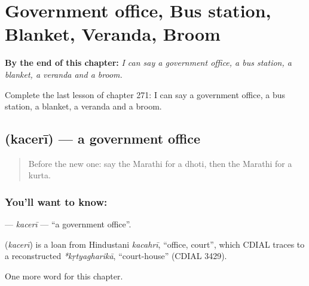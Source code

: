 
\chapter{Government office, Bus station, Blanket, Veranda, Broom}
\label{ch:mr-government-office-bus-station-blanket-veranda-broom}

\begin{chapteropening}
\textbf{By the end of this chapter:} \emph{I can say a government office, a bus station, a blanket, a veranda and a broom.}

Complete the last lesson of chapter 271: I can say a government office, a bus station, a blanket, a veranda and a broom.
\end{chapteropening}

\section[\texorpdfstring{\mr{कचेरी} (kacerī)}{कचेरी (kacerī)}]{ (kacerī) — a government office}

\label{lesson:MR-C271-kaceri}



\begin{quote}
Before the new one: say the Marathi for a dhoti, then the Marathi for a kurta.
\end{quote}

\subsection*{You'll want to know: }
\textbf{} — \emph{kacerī} — \textquotedblleft{}a government office\textquotedblright{}.

\begin{cousinweb}
\textbf{} (\emph{kacerī}) is a loan from Hindustani \emph{kacahrī}, \textquotedblleft{}office, court\textquotedblright{}, which CDIAL traces to a reconstructed \emph{*kṛtyagharikā}, \textquotedblleft{}court-house\textquotedblright{} (CDIAL 3429).
\end{cousinweb}

\begin{grammarlens}[title={What you've built}]
One more word for this chapter.
\end{grammarlens}

